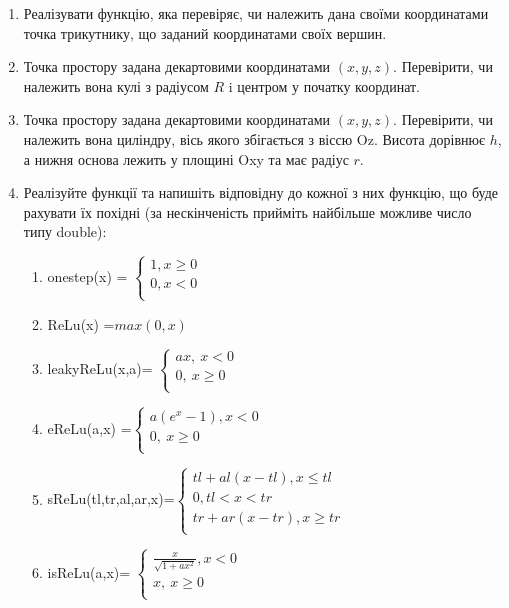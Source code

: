 \documentclass[a5paper,titlepage,openany,twoside,draft]{book_unv}%
\makeatletter
\newcommand{\xslalph}[1]{\expandafter\@xslalph\csname c@#1\endcsname}
\newcommand{\@xslalph}[1]{%
    \ifcase#1\or а\or б\or в\or г\or д\or e\or є\or ж\or з\or i%
    \or й\or к\or л\or м\or н\or о\or п\or р\or с\or т%
    \or у\or ф\or х\or ц\or ч\or ш\or ю\or я\or аа\or бб\or вв%
    \else\@ctrerr\fi%
}
\makeatother
\begin{document}
\begin{enumerate}
\item
  Реалізувати функцію, яка перевіряє, чи належить дана своїми координатами
 точка трикутнику, що заданий координатами своїх вершин.
\item
  Точка простору задана декартовими координатами $(x, y, z)$. Перевірити,
  чи належить вона кулі з радіусом $R$ i центром у початку координат.
\item
  Точка простору задана декартовими координатами $(x, y, z)$. Перевірити,
  чи належить вона циліндру, вісь якого збігається з віссю Oz. Висота
  дорівнює $h$, а нижня основа лежить у площині Oxy та має радіус $r$.
\item
  Реалізуйте функції та напишіть відповідну до кожної з них функцію, що
  буде рахувати їх похідні (за нескінченість прийміть найбільше можливе 
число типу double):
\begin{enumerate}[label=\xslalph*)]
\item onestep(x) = \(\left\{ \begin{matrix}
1,x \geq 0 \\
0,x < 0 \\
\end{matrix} \right.\ \)

\item 
ReLu(x) =\(max(0,x)\)

\item
leakyReLu(x,a)= \(\left\{ \begin{matrix}
ax,\ x < 0 \\
0,\ x \geq 0 \\
\end{matrix} \right.\ \)

\item 
eReLu(a,x) =\(\left\{ \begin{matrix}
a(e^{x} - 1),x < 0 \\
0,\ x \geq 0 \\
\end{matrix} \right.\ \)

\item 
sReLu(tl,tr,al,ar,x)=\(\left\{ \begin{matrix}
tl + al\left( x - tl \right),x \leq tl \\
0,tl < x < tr \\
tr + ar\left( x - tr \right),x \geq tr \\
\end{matrix} \right.\ \)

\item
 isReLu(a,x)= \(\left\{ \begin{matrix}
\frac{x}{\sqrt{1 + ax^{2}}},x < 0 \\
x,\ x \geq 0 \\
\end{matrix} \right.\ \)


\end{enumerate}
\end{enumerate}
\end{document}

